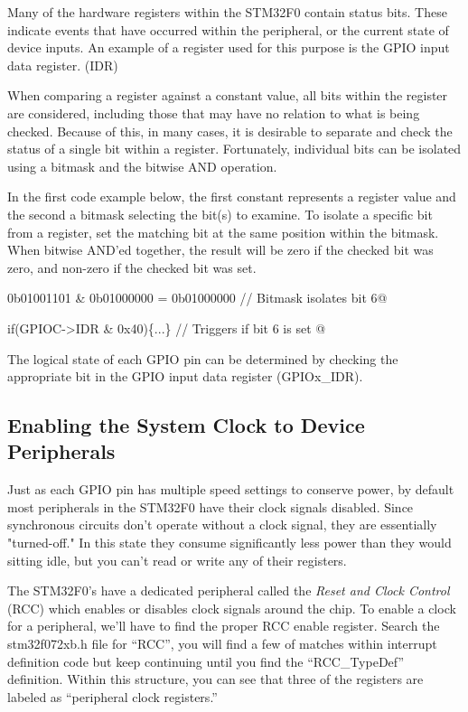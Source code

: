 \documentclass[11pt,fleqn]{book} %
\makeatletter
\newcommand{\ilcode}[1]{
    \begin{center} \parskip=-15pt \colorbox{gray!20!white}{
        \parbox{\columnwidth-2\fboxsep}{
            \lstinline@#1@
        }
    } \end{center}
}
\makeatother
\begin{document}
Many of the hardware registers within the STM32F0 contain status bits. These indicate events that have occurred within the peripheral, or the current state of device inputs. An example of a register used for this purpose is the GPIO input data register. (IDR)

When comparing a register against a constant value, all bits within the register are considered, including those that may have no relation to what is being checked. Because of this, in many cases, it is desirable to separate and check the status of a single bit within a register. Fortunately, individual bits can be isolated using a bitmask and the bitwise AND operation. 

\begin{example} 
In the first code example below, the first constant represents a register value and the second a bitmask selecting the bit(s) to examine. To isolate a specific bit from a register, set the matching bit at the same position within the bitmask. When bitwise AND'ed together, the result will be zero if the checked bit was zero, and non-zero if the checked bit was set. 

\ilcode{0b01001101 \& 0b01000000 = 0b01000000  // Bitmask isolates bit 6}

\ilcode{if(GPIOC->IDR \& 0x40)\{...\} // Triggers if bit 6 is set }
\smallskip
\end{example}

\begin{exercise}
    The logical state of each GPIO pin can be determined by checking the appropriate bit in the GPIO input data register (GPIOx\_IDR). 
    
\end{exercise}    
    
\subsection{Enabling the System Clock to Device Peripherals}

Just as each GPIO pin has multiple speed settings to conserve power, by default most peripherals in the STM32F0 have their clock signals disabled. Since synchronous circuits don't operate without a clock signal, they are essentially "turned-off." In this state they consume significantly less power than they would sitting idle, but you can't read or write any of their registers.

The STM32F0's have a dedicated peripheral called the \textit{Reset and Clock Control} (RCC) which enables or disables clock signals around the chip. To enable a clock for a peripheral, we'll have to find the proper RCC enable register. Search the stm32f072xb.h file for ``RCC'', you will find a few of matches within interrupt definition code but keep continuing until you find the ``RCC\_TypeDef'' definition. Within this structure, you can see that three of the registers are labeled as ``peripheral clock registers.''
\end{document}
